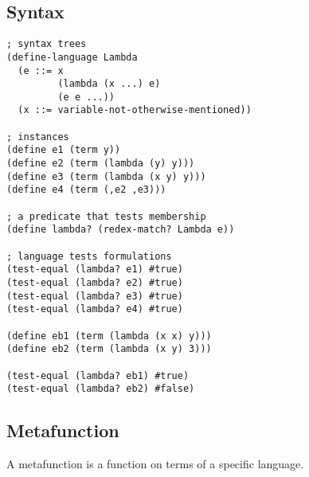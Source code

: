 \subsection{Syntax}

\begin{lstlisting}[frame=none,numbers=none]
; syntax trees
(define-language Lambda
  (e ::= x
         (lambda (x ...) e)
         (e e ...))
  (x ::= variable-not-otherwise-mentioned))

; instances
(define e1 (term y))
(define e2 (term (lambda (y) y)))
(define e3 (term (lambda (x y) y)))
(define e4 (term (,e2 ,e3)))

; a predicate that tests membership
(define lambda? (redex-match? Lambda e))

; language tests formulations
(test-equal (lambda? e1) #true)
(test-equal (lambda? e2) #true)
(test-equal (lambda? e3) #true)
(test-equal (lambda? e4) #true)

(define eb1 (term (lambda (x x) y)))
(define eb2 (term (lambda (x y) 3)))

(test-equal (lambda? eb1) #true)
(test-equal (lambda? eb2) #false)
\end{lstlisting}

\subsection{Metafunction}

A metafunction is a function on terms of a specific language.

